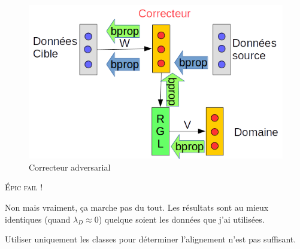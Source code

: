 
\label{day:06-04-2016}


\begin{figure}[H]
\centering
\includegraphics[width=0.45\linewidth]{fig/05-04-2016/Correcteur-Adversarial.png}
\caption{Correcteur adversarial}
\label{fig:correcteur_adversarial2}
\end{figure}

{\huge \textsc{Épic fail !}}

Non mais vraiment, ça marche pas du tout. Les résultats sont au mieux 
identiques (quand $\lambda_D\approx 0$) quelque soient les données que j'ai utilisées.



Utiliser uniquement les classes pour déterminer l'alignement n'est pas suffisant.


